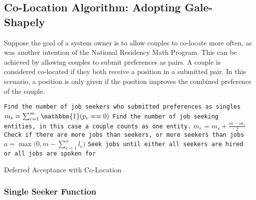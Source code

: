 \subsection{Co-Location Algorithm: Adopting Gale-Shapely}

Suppose the goal of a system owner is to allow couples to co-locate more often, as was another intention of the National Residency Math Program. This can be achieved by allowing couples to submit preferences as pairs. A couple is considered co-located if they both receive a position in a submitted pair. In this scenario, a position is only given if the position improves the combined preference of the couple.

\begin{algorithm}[H]
\SetAlgoLined
{} 
 \texttt{Find the number of job seekers who submitted preferences as singles} \;
 $m_s =  \sum_{c=1}^m \mathbbm{1}(p_c == 0)$ \;
 \texttt{Find the number of job seeking entities, in this case a couple counts as one entity.} \;
 $m_e = m_s + \frac{m - m_s}{2} $ \;
 \texttt{Check if there are more jobs than seekers, or more seekers than jobs} \;
 $a = \max \big(0, m - \sum_{c = 1}^n l_c \big)$\;
 \texttt{Seek jobs until either all seekers are hired or all jobs are spoken for} \;
 \caption{Deferred Acceptance with Co-Location}
\end{algorithm}

\subsubsection{Single Seeker Function}

